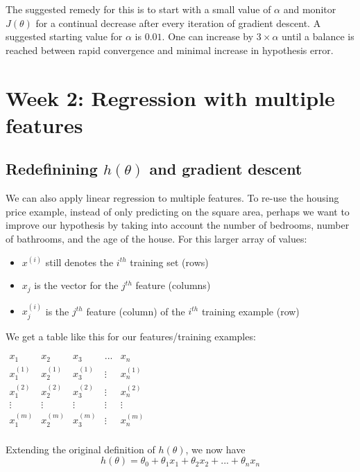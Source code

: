 \documentclass[11pt]{article}
\begin{document}
The suggested remedy for this is to start with a small value of \(\alpha\) and
monitor \(J(\theta)\) for a continual decrease after every iteration of gradient
descent. A suggested starting value for \(\alpha\) is \(0.01\). One can increase by
\(3 \times \alpha\) until a balance is reached between rapid convergence and minimal
increase in hypothesis error.
\section{Week 2: Regression with multiple features}
\label{sec-2}
\subsection{Redefinining \(h(\theta)\) and gradient descent}
\label{sec-2-1}

We can also apply linear regression to multiple features. To re-use the housing price
example, instead of only predicting on the square area, perhaps we want to improve
our hypothesis by taking into account the number of bedrooms, number of bathrooms,
and the age of the house. For this larger array of values:

\begin{itemize}
\item \(x^{(i)}\) still denotes the \(i^{th}\) training set (rows)
\item \(x_j\) is the vector for the \(j^{th}\) feature (columns)
\item \(x^{(i)}_j\) is the \(j^{th}\) feature (column) of the \(i^{th}\) training example (row)
\end{itemize}

We get a table like this for our features/training examples:

\(
\begin{array}{c|c|c|c|c}
x_1 & x_2 & x_3 & ... & x_n \\
\hline
x^{(1)}_1 & x^{(1)}_2 & x^{(1)}_3 & \vdots & x^{(1)}_n \\
x^{(2)}_1 & x^{(2)}_2 & x^{(2)}_3 & \vdots & x^{(2)}_n \\
\vdots & \vdots & \vdots & \vdots & \vdots \\
x^{(m)}_1 & x^{(m)}_2 & x^{(m)}_3 & \vdots & x^{(m)}_n \\
\end{array}
\)

Extending the original definition of \(h(\theta)\), we now have
\[
h(\theta) = \theta_0 + \theta_1 x_1 + \theta_2 x_2 + ... + \theta_n x_n
\]
\end{document}
